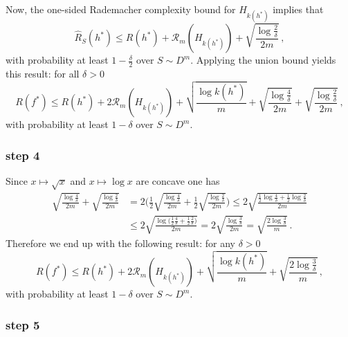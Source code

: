 \documentclass[a4paper]{article}
\begin{document}
\noindent Now, the one-sided Rademacher complexity bound for $H_{k(h^*)}$ implies
that
\[ \hat{R}_S(h^*) \leq R(h^*) + \mathcal{R}_m(H_{k(h^*)})
  + \sqrt{\frac{\log\frac{2}{\delta}}{2m}} \,, \]
with probability at least $1-\frac{\delta}{2}$ over $S\sim D^m$.
Applying the union bound yields this result: for all $\delta>0$
\[ R(f^*) \leq R(h^*) + 2\mathcal{R}_m(H_{k(h^*)})
  + \sqrt{\frac{\log k(h^*)}{m}}
  + \sqrt{\frac{\log\frac{4}{\delta}}{2m}}
  + \sqrt{\frac{\log\frac{2}{\delta}}{2m}} \,, \]
with probability at least $1-\delta$ over $S\sim D^m$.


\subsubsection*{step 4} %
\label{ssub:step_1d4}

Since $x\mapsto\sqrt{x}$ and $x\mapsto \log x$ are concave one has
\begin{align*}
  \sqrt{\frac{\log\frac{4}{\delta}}{2m}} + \sqrt{\frac{\log\frac{2}{\delta}}{2m}}
  &= 2 \Biggl( \frac{1}{2}\sqrt{\frac{\log\frac{4}{\delta}}{2m}}
      + \frac{1}{2} \sqrt{\frac{\log\frac{2}{\delta}}{2m}} \Biggr)
  \leq 2 \sqrt{\frac{\frac{1}{2} \log\frac{4}{\delta}+\frac{1}{2} \log\frac{2}{\delta}}{2m}} \\
  &\leq 2 \sqrt{\frac{\log\bigl(\frac{1}{2}\frac{4}{\delta} + \frac{1}{2} \frac{2}{\delta}\bigr)}{2m}}
  = 2 \sqrt{\frac{\log\frac{3}{\delta}}{2m}}
  = \sqrt{\frac{2\log\frac{3}{\delta}}{m}} \,.
\end{align*}
Therefore we end up with the following result: for any $\delta>0$
\[ R(f^*) \leq R(h^*) + 2\mathcal{R}_m(H_{k(h^*)})
          + \sqrt{\frac{\log k(h^*)}{m}}
          + \sqrt{\frac{2\log\frac{3}{\delta}}{m}}
  \,, \]
with probability at least $1-\delta$ over $S\sim D^m$.


\subsubsection*{step 5} %
\label{ssub:step_1d5}
\end{document}

